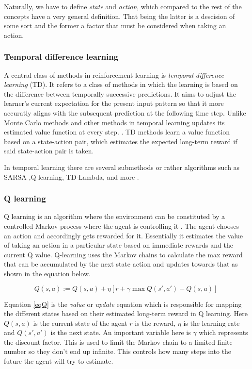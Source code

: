 Naturally, we have to define \textit{state} and \textit{action}, which compared to the rest of the concepts have a very general definition. That being the latter is a descision of some sort and the former a factor that must be considered when taking an action. 

\subsubsection{Temporal difference learning}

A central class of methods in reinforcement learning is \textit{temporal difference learning} (TD). It refers to a class of methods in which the learning is based on the difference between temporally successive predictions. It aims to adjust the learner's current expectation for the present input pattern so that it more accuratly aligns with the subsequent prediction at the following time step. Unlike Monte Carlo methods and other methods in temporal learning updates its estimated value function at every step. \cite{tesauro1995temporal}.  TD methods learn a value function based on a state-action pair, which estimates the expected long-term reward if said state-action pair is taken. 

In temporal learning there are several submethods or rather algorithms such as SARSA ,Q learning, TD-Lambda, and more \cite{eiben2007reinforcement}.\\

\subsubsection{Q learning}
Q learning is an algorithm where the environment can be constituted by a controlled Markov process where the agent is controlling it \cite{watkins1992q}. The agent chooses an action and accordingly gets rewarded for it. Essentially it estimates the value of taking an action in a particular state based on immediate rewards and the current Q value. Q-learning uses the Markov chains to calculate the max reward that can be accumulated by the next state action and updates towards that as shown in the equation below.

\begin{equation} \label{eqQ}
    { Q(s,a) := Q(s,a) + \eta [r + \gamma \max Q(s',a') - Q(s,a)]}
\end{equation}

Equation \ref{eqQ} is the \textit{value} or \textit{update} equation which is responsible for mapping the different states based on their estimated long-term reward in Q learning. Here $Q(s,a)$ is the current state of the agent $r$ is the reward, $\eta$ is the learning rate and $Q(s',a')$ is the next state. An important variable here is $\gamma$ which represents the discount factor. This is used to limit the Markov chain to a limited finite number so they don't end up infinite. This controls how many steps into the future the agent will try to estimate. 


